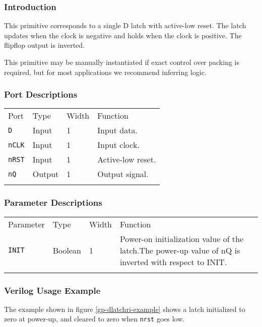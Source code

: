 \documentclass[11pt]{article}
\newcommand{\tokenstyle}[1]{\texttt{#1}}
\newcommand{\wirestyle}[1]{\texttt{#1}}
\newcommand{\whenstyle}[1]{{\fontseries{sb}\selectfont#1}}
\newcommand{\thinhline}{\Xhline{1\arrayrulewidth}}
\newcommand{\thickhline}{\Xhline{2.5\arrayrulewidth}}
\begin{document}
\subsubsection{Introduction}
This primitive corresponds to a single D latch with active-low reset. The latch updates when the clock is negative and holds 
when the clock is positive. The flipflop output is inverted.

This primitive may be manually instantiated if exact control over packing is required, but for most applications we
recommend inferring logic.

\subsubsection{Port Descriptions}

\begin{tabularx}{\textwidth}{lllX}
\thinhline
\whenstyle{Port} & \whenstyle{Type} & \whenstyle{Width} & \whenstyle{Function} \\
\thickhline
\tokenstyle{D} & Input & 1 & Input data. \\
\thinhline
\tokenstyle{nCLK} & Input & 1 & Input clock. \\
\thinhline
\tokenstyle{nRST} & Input & 1 & Active-low reset. \\
\thinhline
\tokenstyle{nQ} & Output & 1 & Output signal. \\
\thinhline
\end{tabularx}

\subsubsection{Parameter Descriptions}

\begin{tabularx}{\textwidth}{lllX}
\thinhline
\whenstyle{Parameter} & \whenstyle{Type} & \whenstyle{Width} & \whenstyle{Function} \\
\thickhline
\tokenstyle{INIT} & Boolean & 1 & Power-on initialization value of the latch.\newline The power-up value of nQ is
inverted with respect to INIT.\\
\thinhline
\end{tabularx}

\subsubsection{Verilog Usage Example}

The example shown in figure \ref{gp-dlatchri-example} shows a latch initialized to zero at power-up, and cleared to zero
when \wirestyle{nrst} goes low.
\end{document}
